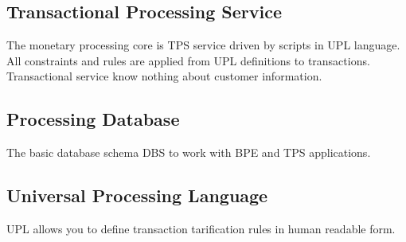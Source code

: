 \subsection{Transactional Processing Service}
The monetary processing core is TPS service driven by scripts in UPL language.
All constraints and rules are applied from UPL definitions to transactions.
Transactional service know nothing about customer information.

\subsection{Processing Database}
The basic database schema DBS to work with BPE and TPS applications.

\subsection{Universal Processing Language}
UPL allows you to define transaction tarification rules in human readable form.